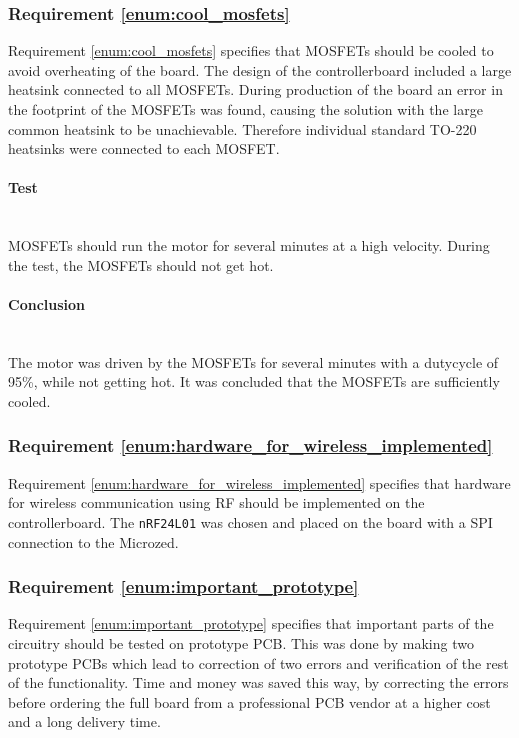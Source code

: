 \subsubsection{Requirement \ref{enum:cool_mosfets}} %
\label{ssub:requirement_ref_enum:cool_mosfets}
Requirement \ref{enum:cool_mosfets} specifies that MOSFETs should be cooled to avoid overheating of the board. 
The design of the controllerboard included a large heatsink connected to all MOSFETs. 
During production of the board an error in the footprint of the MOSFETs was found, causing the solution with the large common heatsink to be unachievable.
Therefore individual standard TO-220 heatsinks were connected to each MOSFET.

\paragraph{Test}~\\
MOSFETs should run the motor for several minutes at a high velocity. 
During the test, the MOSFETs should not get hot.

\paragraph{Conclusion}~\\
The motor was driven by the MOSFETs for several minutes with a dutycycle of 95\%, while not getting hot.
It was concluded that the MOSFETs are sufficiently cooled.

\subsubsection{Requirement \ref{enum:hardware_for_wireless_implemented}} %
\label{ssub:requirement_enum:hardware_for_wireless_implemented}
Requirement \ref{enum:hardware_for_wireless_implemented} specifies that hardware for wireless communication using RF should be implemented on the controllerboard.
The \texttt{nRF24L01} was chosen and placed on the board with a SPI connection to the Microzed.

\subsubsection{Requirement \ref{enum:important_prototype}} %
\label{ssub:requirement_enum:important_prototype}
Requirement \ref{enum:important_prototype} specifies that important parts of the circuitry should be tested on prototype PCB.
This was done by making two prototype PCBs which lead to correction of two errors and verification of the rest of the functionality.
Time and money was saved this way, by correcting the errors before ordering the full board from a professional PCB vendor at a higher cost and a long delivery time.


